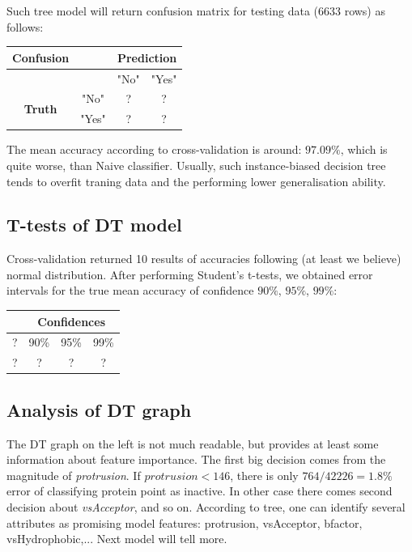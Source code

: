 \documentclass[%
 aip,
 jmp,%
 amsmath,amssymb,
 reprint,%
]{revtex4-1}
\begin{document}
Such tree model will return confusion matrix for testing data (6633 rows) as follows:

\begin{center}
	\begin{tabular}{c|c|c c|}
	    \textbf{Confusion}  & & \multicolumn{2}{|c|}{\textbf{Prediction}} \\
		\hline
		  & & "No" & "Yes"\\
		\hline
		\multirow{2}{4em}{\textbf{Truth}} & "No" & ? & ? \\
		  & "Yes" & ? & ? \\
		\hline
	\end{tabular}
\end{center}

The mean accuracy according to cross-validation is around: \textbf{$97.09\%$}, which is quite worse, than Naive classifier. Usually, such instance-biased decision tree tends to overfit traning data and the performing lower generalisation ability.

\subsection{T-tests of DT model}

Cross-validation returned 10 results of accuracies following (at least we believe) normal distribution. After performing Student's t-tests, we obtained error intervals for the true mean accuracy of confidence $90\%$, $95\%$, $99\%$:

\begin{center}
	\begin{tabular}{c|c|c|c|}
    	  & \multicolumn{3}{|c|}{\textbf{Confidences}} \\
		\hline
		? & 90\% & 95\% & 99\% \\
		\hline
		? & ? & ? & ? \\
		\hline
	\end{tabular}
\end{center}

\subsection{Analysis of DT graph}

The DT graph on the left is not much readable, but provides at least some information about feature importance. The first big decision comes from the magnitude of \textit{protrusion}. If $protrusion < 146$, there is only $764/42226=1.8\%$ error of classifying protein point as inactive. In other case there comes second decision about \textit{vsAcceptor}, and so on. According to tree, one can identify several attributes as promising model features: protrusion, vsAcceptor, bfactor, vsHydrophobic,... Next model will tell more.
\end{document}
